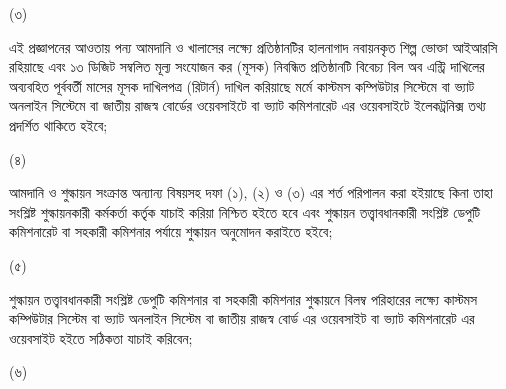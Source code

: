 \documentclass[12pt]{article}
\begin{document}
\begin{minipage}[t]{0.05\linewidth}
(৩)
\end{minipage}
\begin{minipage}[t]{0.9\linewidth}
এই প্রজ্ঞাপনের আওতায় পন্য আমদানি ও খালাসের লক্ষ্যে
প্রতিষ্ঠানটির হালনাগাদ নবায়নকৃত শিল্প ভোক্তা
আইআরসি রহিয়াছে এবং ১৩ ডিজিট সম্বলিত মূল্য
সংযোজন কর (মূসক) নিবন্ধিত প্রতিষ্ঠানটি বিবেচ্য
বিল অব এন্ট্রি দাখিলের অব্যবহিত পূর্ববর্তী মাসের
মূসক দাখিলপত্র (রিটার্ন) দাখিল করিয়াছে মর্মে
কাস্টমস  কম্পিউটার সিস্টেমে বা ভ্যাট অনলাইন সিস্টেমে
বা জাতীয় রাজস্ব বোর্ডের ওয়েবসাইটে বা ভ্যাট কমিশনারেট
এর ওয়েবসাইটে ইলেকট্রনিক্স তথ্য প্রদর্শিত থাকিতে হইবে;
\\
\end{minipage}
\begin{minipage}[t]{0.05\linewidth}
\hspace{1em}
\end{minipage}
\begin{minipage}[t]{0.05\linewidth}
(৪)
\end{minipage}
\begin{minipage}[t]{0.9\linewidth}
আমদানি ও শুল্কায়ন সংক্রান্ত অন্যান্য বিষয়সহ
দফা (১), (২) ও (৩) এর শর্ত পরিপালন করা হইয়াছে কিনা
তাহা সংশ্লিষ্ট শুল্কায়নকারী কর্মকর্তা কর্তৃক যাচাই করিয়া
নিশ্চিত হইতে হবে এবং শুল্কায়ন তত্ত্বাবধানকারী সংশ্লিষ্ট ডেপুটি
কমিশনারেট বা সহকারী কমিশনার পর্যায়ে শুল্কায়ন
অনুমোদন করাইতে হইবে;
\\
\end{minipage}
\begin{minipage}[t]{0.05\linewidth}
\hspace{1em}
\end{minipage}
\begin{minipage}[t]{0.05\linewidth}
(৫)
\end{minipage}
\begin{minipage}[t]{0.9\linewidth}
শুল্কায়ন তত্ত্বাবধানকারী সংশ্লিষ্ট ডেপুটি কমিশনার বা
সহকারী কমিশনার শুল্কায়নে বিলম্ব পরিহারের লক্ষ্যে
কাস্টমস কম্পিউটার সিস্টেম বা ভ্যাট
অনলাইন সিস্টেম বা জাতীয় রাজস্ব বোর্ড এর
ওয়েবসাইট বা ভ্যাট কমিশনারেট এর ওয়েবসাইট
হইতে সঠিকতা যাচাই করিবেন;
\\
\end{minipage}
\begin{minipage}[t]{0.05\linewidth}
\hspace{1em}
\end{minipage}
\begin{minipage}[t]{0.05\linewidth}
(৬)
\end{minipage}
\end{document}
